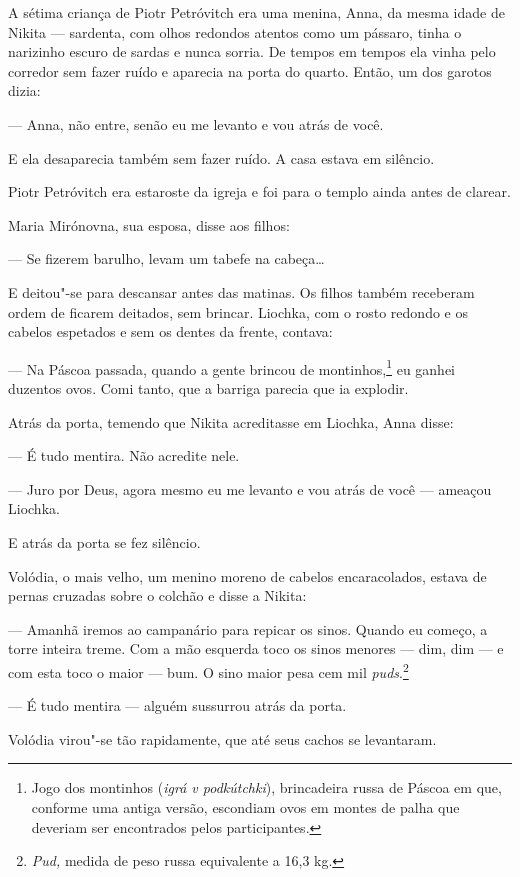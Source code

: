 A sétima criança de Piotr Petróvitch era uma menina, Anna, da mesma
idade de Nikita --- sardenta, com olhos redondos atentos como um
pássaro, tinha o narizinho escuro de sardas e nunca sorria. De
tempos em tempos ela vinha pelo corredor sem fazer ruído e aparecia na
porta do quarto. Então, um dos garotos dizia:

--- Anna, não entre, senão eu me levanto e vou atrás de você.

E ela desaparecia também sem fazer ruído. A casa estava em silêncio.

Piotr Petróvitch era estaroste da igreja e foi para o templo ainda antes
de clarear.

Maria Mirónovna, sua esposa, disse aos filhos:

--- Se fizerem barulho, levam um tabefe na cabeça\ldots{}

E deitou"-se para descansar antes das matinas. Os filhos também receberam
ordem de ficarem deitados, sem brincar. Liochka, com o rosto redondo e
os cabelos espetados e sem os dentes da frente, contava:

--- Na Páscoa passada, quando a gente brincou de montinhos,\footnote{Jogo
  dos montinhos (\emph{igrá v podkútchki}), brincadeira russa de Páscoa
  em que, conforme uma antiga versão, escondiam ovos em montes de palha que
  deveriam ser encontrados pelos participantes.} eu ganhei duzentos
ovos. Comi tanto, que a barriga parecia que ia explodir.

Atrás da porta, temendo que Nikita acreditasse em Liochka, Anna disse:

--- É tudo mentira. Não acredite nele.

--- Juro por Deus, agora mesmo eu me levanto e vou atrás de você ---
ameaçou Liochka.

E atrás da porta se fez silêncio.

Volódia, o mais velho, um menino moreno de cabelos encaracolados, estava
de pernas cruzadas sobre o colchão e disse a Nikita:

--- Amanhã iremos ao campanário para repicar os sinos. Quando eu começo,
a torre inteira treme. Com a mão esquerda toco os sinos menores --- dim,
dim --- e com esta toco o maior --- bum. O sino maior pesa cem mil
\emph{puds}.\footnote{\emph{Pud,} medida de peso russa equivalente a
  16,3 kg.}

--- É tudo mentira --- alguém sussurrou atrás da porta.

Volódia virou"-se tão rapidamente, que até seus cachos se levantaram.

